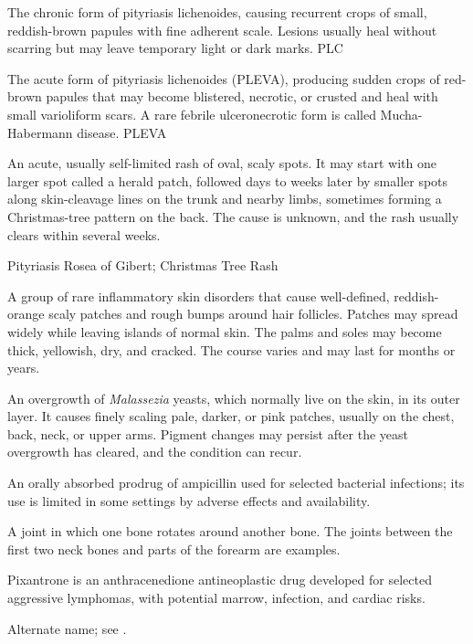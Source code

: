  The chronic form of pityriasis lichenoides, causing recurrent crops of
small, reddish-brown papules with fine adherent scale. Lesions usually heal without
scarring but may leave temporary light or dark marks.
\synonyms
PLC

 The acute form of pityriasis lichenoides (PLEVA), producing
sudden crops of red-brown papules that may become blistered, necrotic, or crusted and
heal with small varioliform scars. A rare febrile ulceronecrotic form is called
Mucha-Habermann disease.
\synonyms
PLEVA

 An acute, usually self-limited rash of oval, scaly spots. It may start with one larger spot called a herald patch, followed days to weeks later by smaller spots along skin-cleavage lines on the trunk and nearby limbs, sometimes forming a Christmas-tree pattern on the back. The cause is unknown, and the rash usually clears within several weeks.

\synonyms
Pityriasis Rosea of Gibert; Christmas Tree Rash

 A group of rare inflammatory skin disorders that cause well-defined, reddish-orange scaly patches and rough bumps around hair follicles. Patches may spread widely while leaving islands of normal skin. The palms and soles may become thick, yellowish, dry, and cracked. The course varies and may last for months or years.

 An overgrowth of \textit{Malassezia} yeasts, which normally live on the skin, in its outer layer. It causes finely scaling pale, darker, or pink patches, usually on the chest, back, neck, or upper arms. Pigment changes may persist after the yeast overgrowth has cleared, and the condition can recur.

 An orally absorbed prodrug of ampicillin used for selected bacterial infections; its use is limited in some settings by adverse effects and availability.

 A joint in which one bone rotates around another bone. The joints between the first two neck bones and parts of the forearm are examples.

 Pixantrone is an anthracenedione antineoplastic drug developed for selected aggressive lymphomas, with potential marrow, infection, and cardiac risks.

 Alternate name; see .

